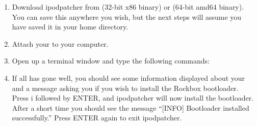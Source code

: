 \begin{enumerate}

\item Download ipodpatcher from
 (32-bit x86
binary) or 
(64-bit amd64 binary). You can save this anywhere you wish, but the next
steps will assume you have saved it in your home directory.

\item Attach your \dap{} to your computer.

\item Open up a terminal window and type the following commands:



\item If all has gone well, you should see some information displayed about
your \dap{} and a message asking you if you wish to install the Rockbox
bootloader. Press i followed by ENTER, and ipodpatcher will now install the
bootloader. After a short time you should see the message ``[INFO] Bootloader
installed successfully.'' Press ENTER again to exit ipodpatcher.

\end{enumerate}
